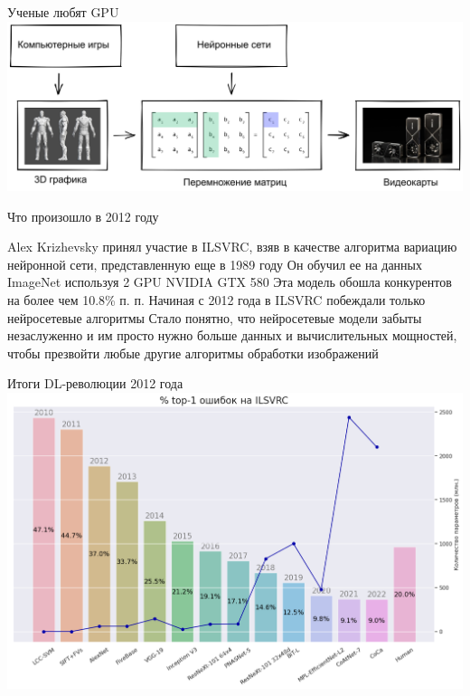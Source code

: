 \documentclass[aspectratio=169, professionalfonts]{beamer}
\begin{document}
\begin{frame}{Ученые любят GPU}
    \centering
    \includegraphics[width=\linewidth]{figures/fig59-matrices.jpg}
\end{frame}

\begin{frame}{Что произошло в 2012 году}
    \begin{outline}
        \1 Alex Krizhevsky принял участие в ILSVRC, взяв в качестве алгоритма вариацию
        нейронной сети, представленную еще в 1989 году
        \1 Он обучил ее на данных ImageNet используя 2 GPU NVIDIA GTX 580
        \1 Эта модель обошла конкурентов на более чем 10.8\% п. п.
        \1 Начиная с 2012 года в ILSVRC побеждали только нейросетевые алгоритмы
        \1 Стало понятно, что нейросетевые модели забыты незаслуженно и им просто нужно
        больше данных и вычислительных мощностей, чтобы презвойти любые другие алгоритмы
        обработки изображений
    \end{outline}
\end{frame}

\begin{frame}{Итоги DL-революции 2012 года}
    \centering
    \includegraphics[width=.75\linewidth]{figures/fig60-ilsvrc-results.jpg}
\end{frame}
\end{document}
